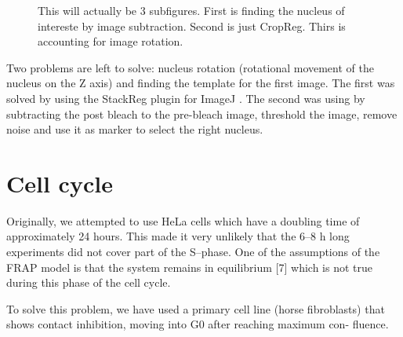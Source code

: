     \begin{figure}
      \centering
      \missingfigure{}
                   {This will actually be 3 subfigures. First is finding the nucleus of intereste by image subtraction.
                    Second is just CropReg. Thirs is accounting for image rotation.}
      \label{fig:cropreg}
    \end{figure}

    Two problems are left to solve: nucleus rotation (rotational movement of the nucleus on the
    Z axis) and finding the template for the first image. The first
    was solved by using the StackReg plugin for ImageJ
    . The second was using by subtracting the post bleach to the
    pre-bleach image, threshold the image, remove noise and use it as marker to select the right nucleus.


\section{Cell cycle}


  


Originally, we attempted to use HeLa cells which have a doubling time of
approximately 24 hours. This made it very unlikely that the 6–8 h long
experiments did not cover part of the S–phase. One of the assumptions of
the FRAP model is that the system remains in equilibrium [7] which is not
true during this phase of the cell cycle.

To solve this problem, we have used a primary cell line (horse fibroblasts)
that shows contact inhibition, moving into G0 after reaching maximum con-
fluence.



